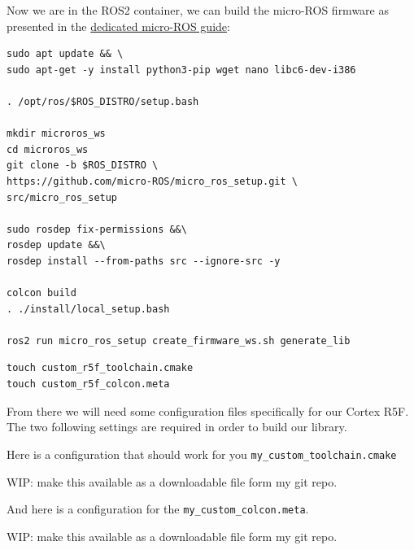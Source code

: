 \documentclass[10pt]{article}
\begin{document}
Now we are in the ROS2 container, we can build the micro-ROS firmware as presented in the \href{https://micro.ros.org/docs/tutorials/advanced/create\_custom\_static\_library}{dedicated micro-ROS guide}:
\begin{tcolorbox}
\begin{verbatim}
sudo apt update && \
sudo apt-get -y install python3-pip wget nano libc6-dev-i386

. /opt/ros/$ROS_DISTRO/setup.bash

mkdir microros_ws
cd microros_ws
git clone -b $ROS_DISTRO \
https://github.com/micro-ROS/micro_ros_setup.git \
src/micro_ros_setup

sudo rosdep fix-permissions &&\
rosdep update &&\
rosdep install --from-paths src --ignore-src -y

colcon build
. ./install/local_setup.bash

ros2 run micro_ros_setup create_firmware_ws.sh generate_lib
\end{verbatim}
\end{tcolorbox}


\begin{tcolorbox}
\begin{verbatim}
touch custom_r5f_toolchain.cmake
touch custom_r5f_colcon.meta
\end{verbatim}
\end{tcolorbox}

From there we will need some configuration files specifically for
our Cortex R5F. The two following settings are required in order to build our library.


Here is a configuration that should work for you \verb|my_custom_toolchain.cmake|

WIP: make this available as a downloadable file form my git repo.
\begin{tcolorbox}

\end{tcolorbox}

And here is a configuration for the \verb|my_custom_colcon.meta|.

WIP: make this available as a downloadable file form my git repo.
\begin{tcolorbox}

\end{tcolorbox}
\end{document}

